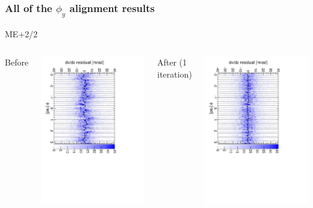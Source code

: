 \documentclass[compress]{beamer}
\begin{document}
\begin{frame}
\frametitle{All of the $\phi_y$ alignment results}
\begin{center}
ME$+$2/2
\end{center}

\begin{columns}
\centering Before

\includegraphics[height=\linewidth, angle=90]{iter01_mep22.pdf}

\centering After (1 iteration)

\includegraphics[height=\linewidth, angle=90]{iter02_mep22.pdf}
\end{columns}


\end{frame}
\end{document}

